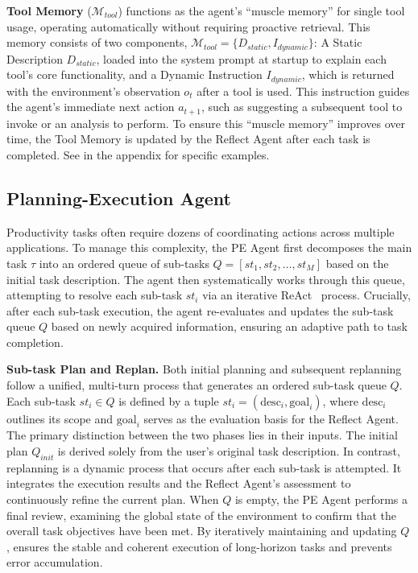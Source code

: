 \textbf{Tool Memory} ($\mathcal{M}_{tool}$) functions as the agent's ``muscle memory'' for single tool usage, operating automatically without requiring proactive retrieval. This memory consists of two components, $\mathcal{M}_{tool} = \{D_{static}, I_{dynamic}\}$: A Static Description $D_{static}$, loaded into the system prompt at startup to explain each tool's core functionality, and a Dynamic Instruction $I_{dynamic}$, which is returned with the environment's observation $o_t$ after a tool is used. This instruction guides the agent's immediate next action $a_{t+1}$, such as suggesting a subsequent tool to invoke or an analysis to perform. To ensure this ``muscle memory'' improves over time, the Tool Memory is updated by the Reflect Agent after each task is completed.
See  in the appendix for specific examples.

\subsection{Planning-Execution Agent}
\label{sec:pe agent}

Productivity tasks often require dozens of coordinating actions across multiple applications. To manage this complexity, the PE Agent first decomposes the main task $\tau$ into an ordered queue of sub-tasks $Q = [st_1, st_2, \dots, st_M]$ based on the initial task description. The agent then systematically works through this queue, attempting to resolve each sub-task $st_i$ via an iterative ReAct~\citep{yao2023react} process. Crucially, after each sub-task execution, the agent re-evaluates and updates the sub-task queue $Q$ based on newly acquired information, ensuring an adaptive path to task completion.

\textbf{Sub-task Plan and Replan.}
Both initial planning and subsequent replanning follow a unified, multi-turn process that generates an ordered sub-task queue $Q$. Each sub-task $st_i \in Q$ is defined by a tuple $st_i = (\text{desc}_i, \text{goal}_i)$, where $\text{desc}_i$ outlines its scope and $\text{goal}_i$ serves as the evaluation basis for the Reflect Agent. The primary distinction between the two phases lies in their inputs. The initial plan $Q_{init}$ is derived solely from the user's original task description. In contrast, replanning is a dynamic process that occurs after each sub-task is attempted. It integrates the execution results and the Reflect Agent's assessment to continuously refine the current plan. When $Q$ is empty, the PE Agent performs a final review, examining the global state of the environment to confirm that the overall task objectives have been met. By iteratively maintaining and updating $Q$, {\method} ensures the stable and coherent execution of long-horizon tasks and prevents error accumulation.


